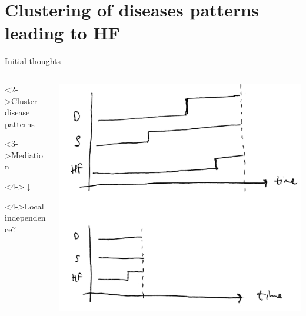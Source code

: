 \documentclass{beamer}\usepackage{listings}
\begin{document}
\section{Clustering of diseases patterns leading to HF}
\label{sec:org8814959}
\begin{frame}[label={sec:org86ad4b4}]{Initial thoughts}
\begin{columns}
\begin{column}{.4\columnwidth}
\begin{block}<2->{\center Cluster disease patterns}
\end{block}

\begin{block}<3->{\center Mediation}
\end{block}

\begin{block}<4->{\center \(\downarrow\)}
\end{block}

\begin{block}<4->{\center Local independence?}
\end{block}
\end{column}

\begin{column}{0.5\columnwidth}
\begin{center}
\includegraphics[width=.9\linewidth]{./figs/disease-pattern-drawing.pdf}
\end{center}
\end{column}
\end{columns}
\end{frame}
\end{document}
